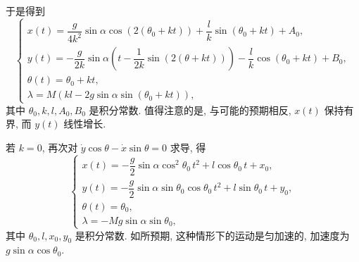 \begin{description}[font=\normalfont,leftmargin=2em,labelwidth=1.5em]
\begin{enumerate}[label=(\alph*),ref=\alph*,leftmargin=*]
\[\]
于是得到
\[
  \begin{cases}
   x(t)=\dfrac{g}{4k^2}\sin\alpha\cos(2(\theta_0+kt))+\dfrac lk\sin(\theta_0+kt)+A_0,\\[4pt]
   y(t)=-\dfrac{g}{2k}\sin\alpha\left(t-\dfrac1{2k}\sin(2(\theta+kt))\right)
        -\dfrac lk\cos(\theta_0+kt)+B_0,\\[4pt]
   \theta(t)=\theta_0+kt,\\
   \lambda=M(kl-2g\sin\alpha\sin(\theta_0+kt)),
  \end{cases}
\]
其中 $\theta_0,k,l,A_0,B_0$ 是积分常数. 值得注意的是, 与可能的预期相反, $x(t)$ 保持有界, 而 $y(t)$ 线性增长.

若 $k=0$, 再次对 $\dot y\cos\theta-\dot x\sin\theta=0$ 求导, 得
\[
  \begin{cases}
   x(t)=-\dfrac g2\sin\alpha\cos^2\theta_0\,t^2+l\cos\theta_0\,t+x_0,\\[4pt]
   y(t)=-\dfrac g2\sin\alpha\sin\theta_0\cos\theta_0\,t^2+l\sin\theta_0\,t+y_0,\\[4pt]
   \theta(t)=\theta_0,\\
   \lambda=-Mg\sin\alpha\sin\theta_0,
  \end{cases}
\]
其中 $\theta_0,l,x_0,y_0$ 是积分常数. 如所预期, 这种情形下的运动是匀加速的, 加速度为 $g\sin\alpha\cos\theta_0$.
\end{enumerate}
\end{description}
